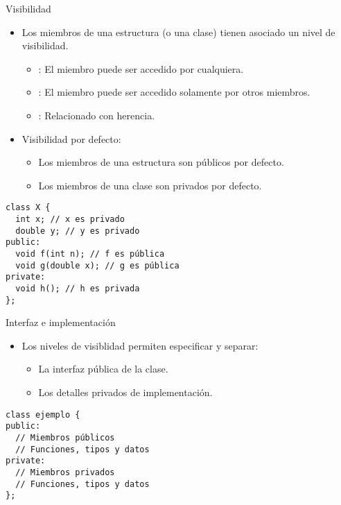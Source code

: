 \begin{frame}[t,fragile]{Visibilidad}
\vspace{-0.25cm}
\begin{itemize}
  \item Los miembros de una estructura (o una clase) tienen asociado un nivel de visibilidad.
    \begin{itemize}
      \item {}: El miembro puede ser accedido por cualquiera.
      \item {}: El miembro puede ser accedido solamente por otros miembros.
      \item {}: Relacionado con herencia.
    \end{itemize}
  \item Visibilidad por defecto:
    \begin{itemize}
      \item Los miembros de una estructura son públicos por defecto.
      \item Los miembros de una clase son privados por defecto.
    \end{itemize}
\end{itemize}
\vspace{-0.25cm}
\begin{lstlisting}
class X {
  int x; // x es privado
  double y; // y es privado
public:
  void f(int n); // f es pública
  void g(double x); // g es pública
private:
  void h(); // h es privada
};
\end{lstlisting}
\end{frame}

\begin{frame}[fragile]{Interfaz e implementación}
\begin{itemize}
  \item Los niveles de visiblidad permiten especificar y separar:
    \begin{itemize}
      \item La interfaz pública de la clase.
      \item Los detalles privados de implementación.
    \end{itemize}
\end{itemize}
\begin{lstlisting}
class ejemplo {
public:
  // Miembros públicos
  // Funciones, tipos y datos
private:
  // Miembros privados
  // Funciones, tipos y datos
};
\end{lstlisting}
\end{frame}

